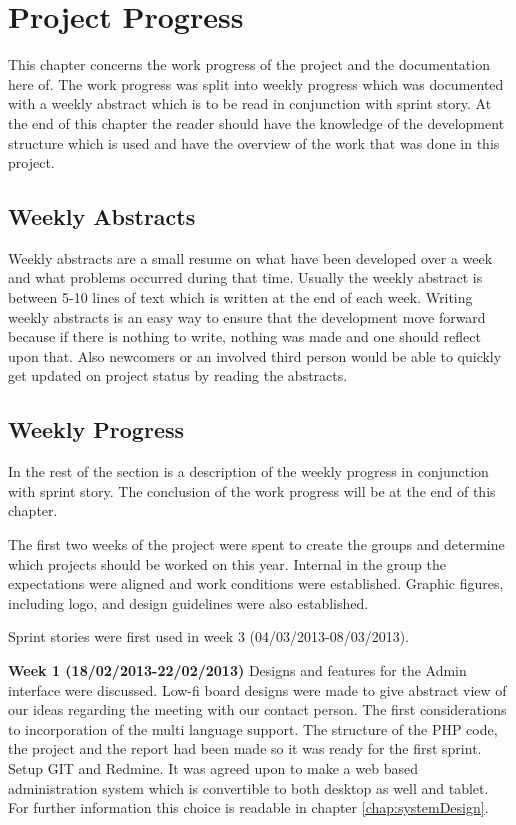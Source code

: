 \chapter{Project Progress}
\label{sec:projectProgress}
This chapter concerns the work progress of the project and the documentation here of. The work progress was split into weekly progress which was documented with a weekly abstract which is to be read in conjunction with sprint story. At the end of this chapter the reader should have the knowledge of the development structure which is used and have the overview of the work that was done in this project. 


\section{Weekly Abstracts}      
\label{subsec:weeklyAbstracts}
Weekly abstracts are a small resume on what have been developed over a week and what problems occurred during that time. Usually the weekly abstract is between 5-10 lines of text which is written at the end of each week. Writing weekly abstracts is an easy way to ensure that the development move forward because if there is nothing to write, nothing was made and one should reflect upon that. Also newcomers or an involved third person would be able to quickly get updated on project status by reading the abstracts.         

\section{Weekly Progress}
\label{subsec:weeklyProgress}
In the rest of the section is a description of the weekly progress in conjunction with sprint story.
The conclusion of the work progress will be at the end of this chapter. 

The first two weeks of the project were spent to create the groups and determine which projects should be worked on this year.  
Internal in the group the expectations were aligned and work conditions were established.
Graphic figures, including logo, and design guidelines were also established.      

Sprint stories were first used in week 3 (04/03/2013-08/03/2013).   

\textbf{Week 1 (18/02/2013-22/02/2013)} 
Designs and features for the Admin interface were discussed.
Low-fi board designs were made to give abstract view of our ideas regarding the meeting with our contact person.   
The first considerations to incorporation of the multi language support.
The structure of the PHP code, the project and the report had been made so it was ready for the first sprint.
Setup GIT and Redmine.
It was agreed upon to make a web based administration system which is convertible to both desktop as well and  tablet.  
For further information this choice is readable in chapter \vref{chap:systemDesign}.


